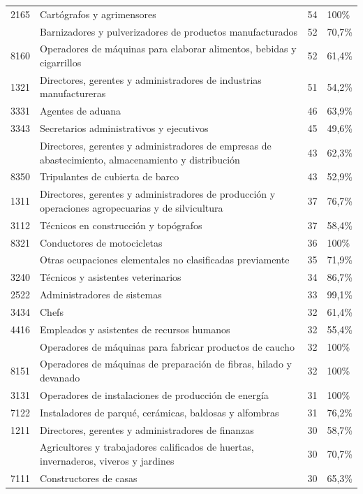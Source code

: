\documentclass[
  11pt,
]{article}
\begin{document}
\begin{longtable}{r>{\raggedright\arraybackslash}p{9cm}rl}
2165 & Cartógrafos y agrimensores & 54 & 100\%\\
\addlinespace
7132 & Barnizadores y pulverizadores de productos manufacturados & 52 & 70,7\%\\
8160 & Operadores de máquinas para elaborar alimentos, bebidas y cigarrillos & 52 & 61,4\%\\
1321 & Directores, gerentes y administradores de industrias manufactureras & 51 & 54,2\%\\
3331 & Agentes de aduana & 46 & 63,9\%\\
3343 & Secretarios administrativos y ejecutivos & 45 & 49,6\%\\
\addlinespace
1324 & Directores, gerentes y administradores de empresas de abastecimiento, almacenamiento y distribución & 43 & 62,3\%\\
8350 & Tripulantes de cubierta de barco & 43 & 52,9\%\\
1311 & Directores, gerentes y administradores de producción y operaciones agropecuarias y de silvicultura & 37 & 76,7\%\\
3112 & Técnicos en construcción y topógrafos & 37 & 58,4\%\\
8321 & Conductores de motocicletas & 36 & 100\%\\
\addlinespace
9629 & Otras ocupaciones elementales no clasificadas previamente & 35 & 71,9\%\\
3240 & Técnicos y asistentes veterinarios & 34 & 86,7\%\\
2522 & Administradores de sistemas & 33 & 99,1\%\\
3434 & Chefs & 32 & 61,4\%\\
4416 & Empleados y asistentes de recursos humanos & 32 & 55,4\%\\
\addlinespace
8141 & Operadores de máquinas para fabricar productos de caucho & 32 & 100\%\\
8151 & Operadores de máquinas de preparación de fibras, hilado y devanado & 32 & 100\%\\
3131 & Operadores de instalaciones de producción de energía & 31 & 100\%\\
7122 & Instaladores de parqué, cerámicas, baldosas y alfombras & 31 & 76,2\%\\
1211 & Directores, gerentes y administradores de finanzas & 30 & 58,7\%\\
\addlinespace
6113 & Agricultores y trabajadores calificados de huertas, invernaderos, viveros y jardines & 30 & 70,7\%\\
7111 & Constructores de casas & 30 & 65,3\%\\

\end{longtable}
\end{document}
